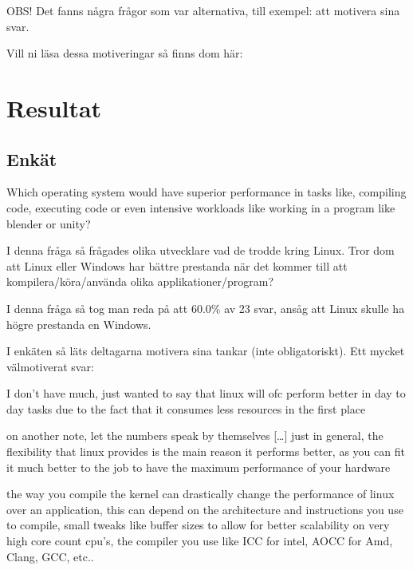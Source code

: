 \documentclass[12pt, a4paper]{report}
\begin{document}
   \vspace{1cm}
 
 
   \small{OBS! Det fanns några frågor som var alternativa, till exempel: att motivera sina svar.
  
   Vill ni läsa dessa motiveringar så finns dom här:} 
 
\vspace{1cm}
\section{Resultat}

    \subsection{Enkät}   \label{form}

\large {Which operating system would have superior performance in tasks like, compiling code, executing code or even intensive workloads like working in a program  like blender or unity?}
 
   \vspace{.5cm}
 
   \normalsize I denna fråga så frågades olika utvecklare vad de trodde kring Linux. Tror dom att Linux eller Windows har bättre prestanda när det kommer till att kompilera/köra/använda olika applikationer/program?
 
 
   \vspace{1cm}
 
 
   \cite{form}


   I denna fråga så tog man reda på att 60.0\% av 23 svar, ansåg att Linux skulle ha högre prestanda en Windows.

    \vspace{.5cm}
    I enkäten så läts deltagarna motivera sina tankar (inte obligatoriskt). Ett mycket välmotiverat svar: \begin{displayquote}I don't have much, just wanted to say that linux will ofc perform better in day to day tasks due to the fact that it consumes less resources in the first place

    on another note, let the numbers speak by themselves \hyperlink{https://www.phoronix.com/scan.php?page=article&item=win10-debian101-intel} [\dots] just in general, the flexibility that linux provides is the main reason it performs better, as you can fit it much better to the job to have the maximum performance of your hardware

    the way you compile the kernel can drastically change the performance of linux over an application, this can depend on the architecture and instructions you use to compile, small tweaks like buffer sizes to allow for better scalability on very high core count cpu's, the compiler you use like ICC for intel, AOCC for Amd, Clang, GCC, etc..\end{displayquote}
\end{document}
